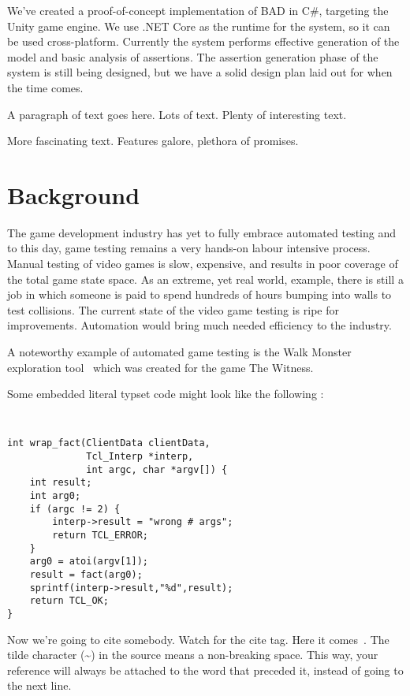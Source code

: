 \documentclass[letterpaper,twocolumn,10pt]{article}
\begin{document}
We've created a proof-of-concept implementation of BAD in C\#, targeting the Unity game engine. We use .NET Core as the runtime for the system, so it can be used cross-platform. Currently the system performs effective generation of the model and basic analysis of assertions. The assertion generation phase of the system is still being designed, but we have a solid design plan laid out for when the time comes.

A paragraph of text goes here.  Lots of text.  Plenty of interesting
text. 

More fascinating text. Features galore, plethora of promises.

\section{Background}

The game development industry has yet to fully embrace automated testing and to this day, game testing remains a very hands-on labour intensive process. Manual testing of video games is slow, expensive, and results in poor coverage of the total game state space. As an extreme, yet real world, example, there is still a job in which someone is paid to spend hundreds of hours bumping into walls to test collisions. The current state of the video game testing is ripe for improvements. Automation would bring much needed efficiency to the industry.

A noteworthy example of automated game testing is the Walk Monster exploration tool~\cite{WalkMonster} which was created for the game The Witness.

Some embedded literal typset code might 
look like the following :

{\tt \small
\begin{verbatim}
int wrap_fact(ClientData clientData,
              Tcl_Interp *interp,
              int argc, char *argv[]) {
    int result;
    int arg0;
    if (argc != 2) {
        interp->result = "wrong # args";
        return TCL_ERROR;
    }
    arg0 = atoi(argv[1]);
    result = fact(arg0);
    sprintf(interp->result,"%d",result);
    return TCL_OK;
}
\end{verbatim}
}

Now we're going to cite somebody.  Watch for the cite tag.
Here it comes~\cite{Chaum1981,Diffie1976}.  The tilde character (\~{})
in the source means a non-breaking space.  This way, your reference will
always be attached to the word that preceded it, instead of going to the
next line.
\end{document}
